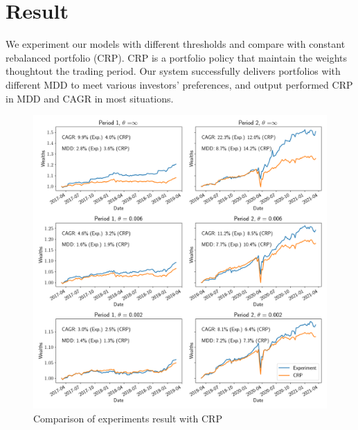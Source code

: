 \section{Result}

We experiment our models with different thresholds and compare with constant rebalanced portfolio (CRP). 
CRP is a portfolio policy that maintain the weights thoughtout the trading period. 
Our system successfully delivers portfolios with different MDD to meet various investors' preferences, and output performed CRP in MDD and CAGR in most situations.
\begin{figure}[ht]
  \includegraphics[width=15cm]{images/crp_compare.png}
  \caption [Comparison of experiments result with CRP]{Comparison of experiments result with CRP}
  \label{fig:crp_compare}
\end{figure}